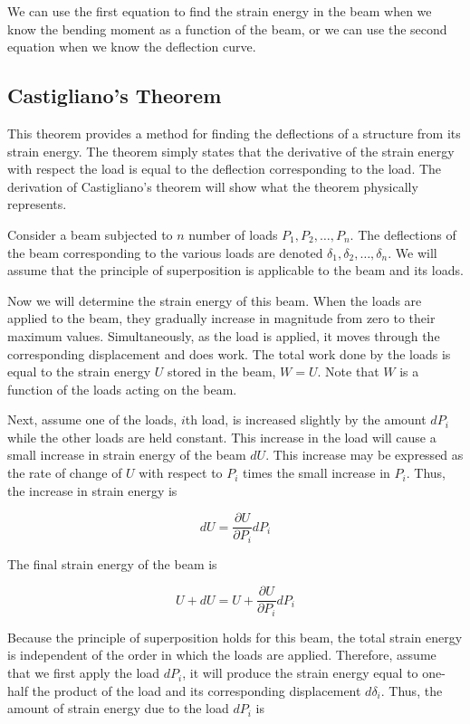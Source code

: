 \documentclass[
10pt,
a4paper,
openany,
svgnames,
]{book} %
\begin{document}
We can use the first equation to find the strain energy in the beam when we know the bending moment as a function of the beam, or we can use the second equation when we know the deflection curve.

\subsection{Castigliano’s Theorem}

This theorem provides a method for finding the deflections of a structure from its strain energy. The theorem simply states that the derivative of the strain energy with respect the load is equal to the deflection corresponding to the load. The derivation of Castigliano’s theorem will show what the theorem physically represents.

Consider a beam subjected to $n$ number of loads $P_1, P_2, \ldots, P_n$. The deflections of the beam corresponding to the various loads are denoted $\delta_1, \delta_2, \ldots, \delta_n$. We will assume that the principle of superposition is applicable to the beam and its loads.

Now we will determine the strain energy of this beam. When the loads are applied to the beam, they gradually increase in magnitude from zero to their maximum values. Simultaneously, as the load is applied, it moves through the corresponding displacement and does work. The total work done by the loads is equal to the strain energy $U$ stored in the beam, $W = U$. Note that $W$ is a function of the loads acting on the beam.

Next, assume one of the loads, $i$th load, is increased slightly by the amount $dP_i$ while the other loads are held constant. This increase in the load will cause a small increase in strain energy of the beam $dU$. This increase may be expressed as the rate of change of $U$ with respect to $P_i$ times the small increase in $P_i$. Thus, the increase in strain energy is

\[dU = \frac{\partial U}{\partial P_i} dP_i\]

The final strain energy of the beam is

\[U + dU = U + \frac{\partial U}{\partial P_i} dP_i\]

Because the principle of superposition holds for this beam, the total strain energy is independent of the order in which the loads are applied. Therefore, assume that we first apply the load $dP_i$, it will produce the strain energy equal to one-half the product of the load and its corresponding displacement $d\delta_i$. Thus, the amount of strain energy due to the load $dP_i$ is
\end{document}
